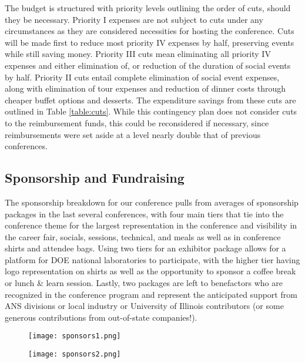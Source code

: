 The budget is structured with priority levels outlining the order of cuts, should they be necessary. Priority I expenses are not subject to cuts under any circumstances as they are considered necessities for hosting the conference. Cuts will be made first to reduce most priority IV expenses by half, preserving events while still saving money. Priority III cuts mean eliminating all priority IV expenses and either elimination of, or reduction of the duration of social events by half. Priority II cuts entail complete elimination of social event expenses, along with elimination of tour expenses and reduction of dinner costs through cheaper buffet options and desserts. The expenditure savings from these cuts are outlined in Table \ref{table:cuts}. While this contingency plan does not consider cuts to the reimbursement funds, this could be reconsidered if necessary, since reimbursements were set aside at a level nearly double that of previous conferences. 

\subsection{Sponsorship and Fundraising}
The sponsorship breakdown for our conference pulls from averages of sponsorship 
packages in the last several conferences, with four main tiers that tie into the conference theme for the largest representation in the conference and visibility in the career fair, socials, sessions, technical, and meals as well as in conference shirts and attendee bags. Using two tiers for an exhibitor package allows for a platform for DOE national laboratories to participate, with the higher tier having logo representation on shirts as well as the opportunity to sponsor a coffee break or lunch \& learn session. Lastly, two packages are left to benefactors who are recognized in the conference program and represent the anticipated support from ANS divisions or local industry or University of Illinois contributors (or some generous contributions from out-of-state companies!). 


\begin{figure}[H]
	\centering
	\texttt{[image: sponsors1.png]}	
\end{figure} 
\vspace{-1cm}
\begin{figure}[H]
	\centering
	\texttt{[image: sponsors2.png]}	
\end{figure} 

